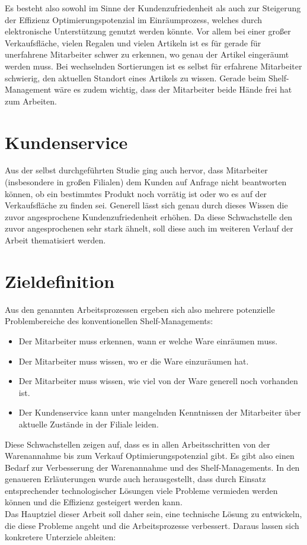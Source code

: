 Es besteht also sowohl im Sinne der Kundenzufriedenheit als auch zur Steigerung der Effizienz Optimierungspotenzial im Einräumprozess, welches durch elektronische Unterstützung genutzt werden könnte. Vor allem bei einer großer Verkaufsfläche, vielen Regalen und vielen Artikeln ist es für gerade für unerfahrene Mitarbeiter schwer zu erkennen, wo genau der Artikel eingeräumt werden muss. Bei wechselnden Sortierungen ist es selbst für erfahrene Mitarbeiter schwierig, den aktuellen Standort eines Artikels zu wissen. Gerade beim Shelf-Management wäre es zudem wichtig, dass der Mitarbeiter beide Hände frei hat zum Arbeiten.

\section{Kundenservice}
Aus der selbst durchgeführten Studie ging auch hervor, dass Mitarbeiter (insbesondere in großen Filialen) dem Kunden auf Anfrage nicht beantworten können, ob ein bestimmtes Produkt noch vorrätig ist oder wo es auf der Verkaufsfläche zu finden sei. Generell lässt sich genau durch dieses Wissen die zuvor angesprochene Kundenzufriedenheit erhöhen. Da diese Schwachstelle den zuvor angesprochenen sehr stark ähnelt, soll diese auch im weiteren Verlauf der Arbeit thematisiert werden. 

\section{Zieldefinition}
\label{sec:zieldefinition}
Aus den genannten Arbeitsprozessen ergeben sich also mehrere potenzielle Problembereiche des konventionellen Shelf-Managements:

\begin{itemize}
	\item Der Mitarbeiter muss erkennen, wann er welche Ware einräumen muss.
	\item Der Mitarbeiter muss wissen, wo er die Ware einzuräumen hat.
	\item Der Mitarbeiter muss wissen, wie viel von der Ware generell noch vorhanden ist.
	\item Der Kundenservice kann unter mangelnden Kenntnissen der Mitarbeiter über aktuelle Zustände in der Filiale leiden.
\end{itemize}

Diese Schwachstellen zeigen auf, dass es in allen Arbeitsschritten von der Warenannahme bis zum Verkauf Optimierungspotenzial gibt. Es gibt also einen Bedarf zur Verbesserung der Warenannahme und des Shelf-Managements. In den genaueren Erläuterungen wurde auch herausgestellt, dass durch Einsatz entsprechender technologischer Lösungen viele Probleme vermieden werden können und die Effizienz gesteigert werden kann.\\
Das Hauptziel dieser Arbeit soll daher sein, eine technische Lösung zu entwickeln, die diese Probleme angeht und die Arbeitsprozesse verbessert. Daraus lassen sich konkretere Unterziele ableiten:

